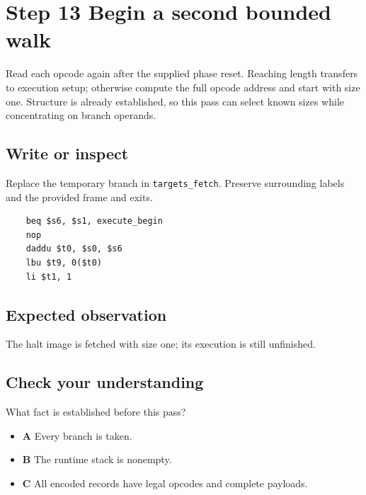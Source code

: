 \section{Step 13 Begin a second bounded walk}\label{vm-s13}

Read each opcode again after the supplied phase reset. Reaching length transfers to execution setup; otherwise compute the full opcode address and start with size one. Structure is already established, so this pass can select known sizes while concentrating on branch operands.

\subsection{Write or inspect}
Replace the temporary branch in \texttt{targets\_fetch}. Preserve surrounding labels and the provided frame and exits.

\begin{verbatim}
    beq $s6, $s1, execute_begin
    nop
    daddu $t0, $s0, $s6
    lbu $t9, 0($t0)
    li $t1, 1
\end{verbatim}
\subsection{Expected observation}
The halt image is fetched with size one; its execution is still unfinished.

\subsection{Check your understanding}
What fact is established before this pass?

\begin{itemize}
  \item \textbf{A} Every branch is taken.
  \item \textbf{B} The runtime stack is nonempty.
  \item \textbf{C} All encoded records have legal opcodes and complete payloads.
\end{itemize}
